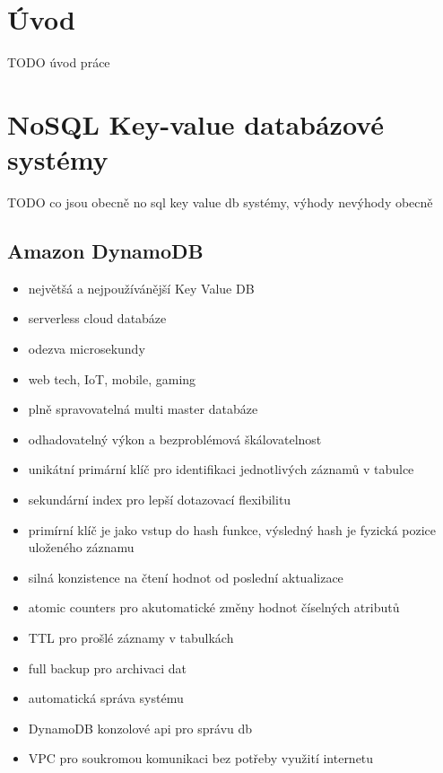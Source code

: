 \documentclass[czech,bachelor,dept460,male,csharp,cpdeclaration]{diploma}
\begin{document}
	
	\MakeTitlePages
	
	\chapter{Úvod}
	
	TODO úvod práce
	
	\chapter{NoSQL Key-value databázové systémy}
	
	TODO co jsou obecně no sql key value db systémy, výhody nevýhody obecně
	
	\section{Amazon DynamoDB}
	\begin{itemize}
		\item největšá a nejpoužívánější Key Value DB
		\item serverless cloud databáze
		\item odezva microsekundy
		\item web tech, IoT, mobile, gaming
		\item plně spravovatelná multi master databáze
		\item odhadovatelný výkon a bezproblémová škálovatelnost
		\item unikátní primární klíč pro identifikaci jednotlivých záznamů v tabulce
		\item sekundární index pro lepší dotazovací flexibilitu
		\item primírní klíč je jako vstup do hash funkce, výsledný hash je fyzická pozice uloženého záznamu
		\item silná konzistence na čtení hodnot od poslední aktualizace
		\item atomic counters pro akutomatické změny hodnot číselných atributů
		\item TTL pro prošlé záznamy v tabulkách
		\item full backup pro archivaci dat
		\item automatická správa systému
		\item DynamoDB konzolové api pro správu db
		\item VPC pro soukromou komunikaci bez potřeby využití internetu
	\end{itemize}
		
\end{document}
